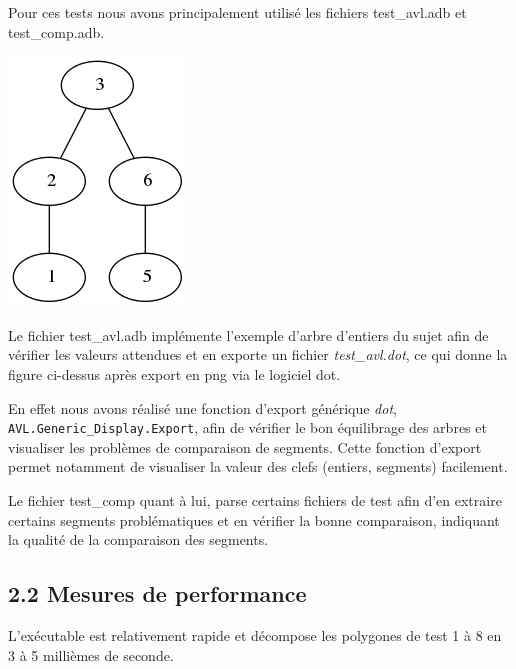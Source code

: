 \documentclass [a4paper,11pt] {report}
\begin{document}
Pour ces tests nous avons principalement utilisé les fichiers test\_avl.adb et test\_comp.adb.

\begin{center}
  \includegraphics[scale=0.5]{entiers.png}
\end{center}

Le fichier test\_avl.adb implémente l'exemple d'arbre d'entiers du sujet afin de vérifier les valeurs attendues et en exporte un fichier \textit{test\_avl.dot}, ce qui donne la figure ci-dessus après export en png via le logiciel dot.


En effet nous avons réalisé une fonction d'export générique \textit{dot}, \lstinline!AVL.Generic_Display.Export!, afin de vérifier le bon équilibrage des arbres et visualiser les problèmes de comparaison de segments.
Cette fonction d'export permet notamment de visualiser la valeur des clefs (entiers, segments) facilement.


Le fichier test\_comp quant à lui, parse certains fichiers de test afin d'en extraire certains segments problématiques et en vérifier la bonne comparaison, indiquant la qualité de la comparaison des segments.




\subsection* {2.2\hspace{3mm} Mesures de performance}

L'exécutable est relativement rapide et décompose les polygones de test 1 à 8 en 3 à 5 millièmes de seconde.
\end{document}

